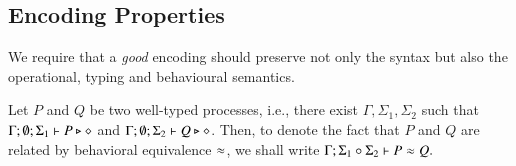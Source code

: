 \subsection{Encoding Properties}

We require that a {\em good} encoding should 
preserve not only the syntax but
also the operational, typing and behavioural
semantics. 

\begin{notation}
Let $P$ and $Q$ be two well-typed processes, i.e., 
there exist $\Gamma, \Sigma_1, \Sigma_2$ such that 
$\Gamma; \emptyset; \Sigma_1 \vdash P \triangleright \diamond$ 
and
$\Gamma; \emptyset; \Sigma_2 \vdash Q \triangleright \diamond$.
Then, to denote the fact that 
$P$ and $Q$ are related by behavioral equivalence $\approx$, we shall write
$
\Gamma; \Sigma_1 \circ \Sigma_2 \vdash P \approx Q.
$
\end{notation}

